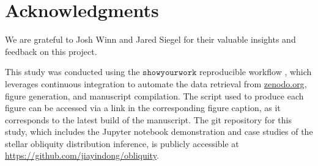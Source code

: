 \documentclass[twocolumn,times]{aastex631}
\begin{document}
\section*{Acknowledgments}
We are grateful to Josh Winn and Jared Siegel for their valuable insights and feedback on this project.

This study was conducted using the \href{https://github.com/showyourwork/showyourwork}{$\mathtt{showyourwork}$} reproducible workflow \citep{Luger2021}, which leverages continuous integration to automate the data retrieval from \href{https://zenodo.org/}{zenodo.org}, figure generation, and manuscript compilation.
The script used to produce each figure can be accessed via a link in the corresponding figure caption, as it corresponds to the latest build of the manuscript.
The git repository for this study, which includes the Jupyter notebook demonstration and case studies of the stellar obliquity distribution inference, is publicly accessible at \url{https://github.com/jiayindong/obliquity}.

\vspace*{5mm}



\end{document}
